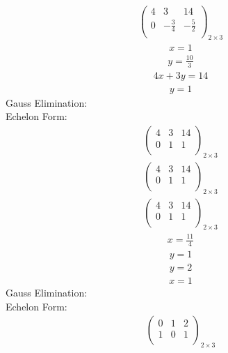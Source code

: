 \documentclass{article}
\begin{document}
\begin{align*}
\left(
\begin{array}{cc|c}
4 & 3 & 14\\
0 & -\frac{3}{4} & -\frac{5}{2}\\
\end{array}
\right)_{2\times 3}
\end{align*}
\begin{align*}
x=1\end{align*}
\begin{align*}
y=\frac{10}{3}\end{align*}
\begin{align*}
4x + 3y=14\end{align*}
\begin{align*}
y=1\end{align*}
Gauss Elimination:\\
Echelon Form:\\
\begin{align*}
\left(
\begin{array}{cc|c}
4 & 3 & 14\\
0 & 1 & 1\\
\end{array}
\right)_{2\times 3}
\end{align*}
\begin{align*}
\left(
\begin{array}{cc|c}
4 & 3 & 14\\
0 & 1 & 1\\
\end{array}
\right)_{2\times 3}
\end{align*}
\begin{align*}
\left(
\begin{array}{cc|c}
4 & 3 & 14\\
0 & 1 & 1\\
\end{array}
\right)_{2\times 3}
\end{align*}
\begin{align*}
x=\frac{11}{4}\end{align*}
\begin{align*}
y=1\end{align*}
\begin{align*}
y=2\end{align*}
\begin{align*}
x=1\end{align*}
Gauss Elimination:\\
Echelon Form:\\
\begin{align*}
\left(
\begin{array}{cc|c}
0 & 1 & 2\\
1 & 0 & 1\\
\end{array}
\right)_{2\times 3}
\end{align*}
\end{document}
